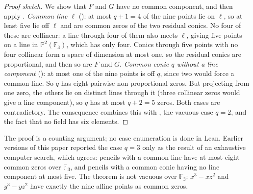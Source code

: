 \documentclass[11pt]{article}
\theoremstyle{definition}
\theoremstyle{remark}
\newcommand{\F}{\mathbb{F}}
\newcommand{\PP}{\mathbb{P}}
\begin{document}
\begin{proof}[Proof sketch]
We show that $F$ and $G$ have no common component, and then apply
. \emph{Common line $\ell$}
(): at most $q+1=4$ of the nine points lie on $\ell$, so at least five
lie off $\ell$ and are common zeros of the two residual conics. No four of these are collinear: a
line through four of them also meets $\ell$, giving five points on a line in $\PP^2(\F_3)$, which has
only four. Conics through five points with no four collinear form a space of dimension at most
one, so the residual conics are proportional, and then so are $F$ and $G$. \emph{Common conic $q$
without a line component} (): at most one of the nine points is off
$q$, since two would force a common line. So $q$ has eight pairwise non-proportional zeros. But
projecting from one zero, the others lie on distinct lines through it (three collinear zeros would
give a line component), so $q$ has at most $q+2=5$ zeros. Both cases are contradictory.
The consequence combines this with , the vacuous case
$q=2$, and the fact that no field has six elements.
\end{proof}

The proof is a counting argument; no case enumeration is done in Lean. Earlier versions of this
paper reported the case $q=3$ only as the result of an exhaustive computer search, which agrees:
pencils with a common line have at most eight common zeros over $\F_3$, and pencils with a common
conic having no line component at most five. The theorem is not vacuous over $\F_3$: $x^3-xz^2$ and
$y^3-yz^2$ have exactly the nine affine points as common zeros.
\end{document}
